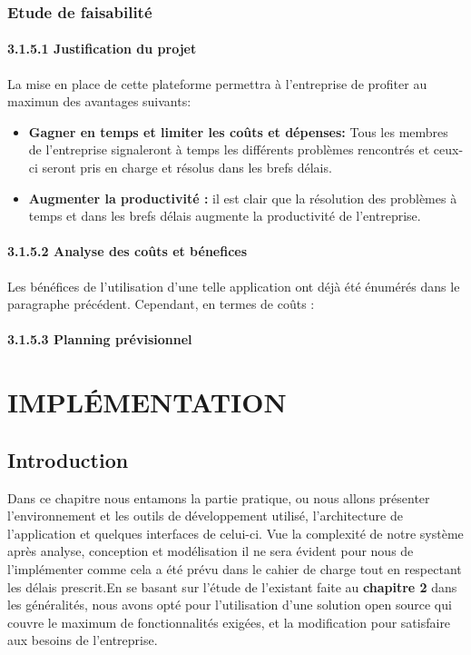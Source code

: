 \documentclass[14pt,openany]{report}%
\begin{document}
\subsection{Etude de faisabilité}
   \subsubsection{3.1.5.1 Justification du projet}
   \textrm{La mise en place de cette plateforme permettra à l'entreprise de profiter au maximun des avantages suivants:\\}
   
   \begin{itemize}
   	\item [\checkmark] \textbf{Gagner en temps et limiter les coûts et dépenses:} Tous les membres de
l’entreprise signaleront à temps les différents problèmes rencontrés et ceux-ci
seront pris en charge et résolus dans les brefs délais. \\ 
   \end{itemize}

\begin{itemize}
	\item [\checkmark] \textbf{Augmenter la productivité :} il est clair que la résolution des problèmes à temps
et dans les brefs délais augmente la productivité de l’entreprise.\\
\end{itemize}
	\subsubsection{3.1.5.2 Analyse des coûts et bénefices}
	\textrm{Les bénéfices de l’utilisation d’une telle application ont déjà été énumérés dans le
paragraphe précédent. Cependant, en termes de coûts :}
	\subsubsection{3.1.5.3 Planning prévisionnel}

\chapter{IMPLÉMENTATION}
\section{Introduction}
 Dans ce chapitre nous entamons la partie pratique, ou nous allons présenter l’environnement et les outils de développement utilisé, l’architecture de l’application et quelques interfaces de celui-ci. Vue la complexité de notre système après analyse, conception et modélisation il ne sera évident pour nous de l'implémenter comme cela a été prévu dans le cahier de charge tout en respectant les délais prescrit.En se basant sur l'étude de l'existant faite au \textbf{chapitre 2} dans les généralités, nous avons opté pour l'utilisation d'une solution open source qui couvre le maximum de fonctionnalités exigées, et la modification pour satisfaire aux besoins de l'entreprise.
\end{document}
